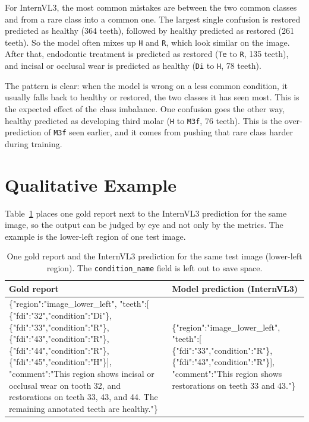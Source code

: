 \documentclass[a4paper,12pt]{report}
\begin{document}
For InternVL3, the most common mistakes are between the two common classes and from a rare class into a common one. The largest single confusion is restored predicted as healthy (364 teeth), followed by healthy predicted as restored (261 teeth). So the model often mixes up \texttt{H} and \texttt{R}, which look similar on the image. After that, endodontic treatment is predicted as restored (\texttt{Te} to \texttt{R}, 135 teeth), and incisal or occlusal wear is predicted as healthy (\texttt{Di} to \texttt{H}, 78 teeth).

The pattern is clear: when the model is wrong on a less common condition, it usually falls back to healthy or restored, the two classes it has seen most. This is the expected effect of the class imbalance. One confusion goes the other way, healthy predicted as developing third molar (\texttt{H} to \texttt{M3f}, 76 teeth). This is the over-prediction of \texttt{M3f} seen earlier, and it comes from pushing that rare class harder during training.

\section{Qualitative Example}

Table~\ref{tab:qualitative} places one gold report next to the InternVL3 prediction for the same image, so the output can be judged by eye and not only by the metrics. The example is the lower-left region of one test image.

\begin{table}[H]
\centering
\caption{One gold report and the InternVL3 prediction for the same test image (lower-left region). The \texttt{condition\_name} field is left out to save space.}
\label{tab:qualitative}
\begin{tabular}{p{6cm}p{6cm}}
\toprule
Gold report & Model prediction (InternVL3) \\
\midrule
{\ttfamily\footnotesize
\{"region":"image\_lower\_left",\newline
"teeth":[\newline
\{"fdi":"32","condition":"Di"\},\newline
\{"fdi":"33","condition":"R"\},\newline
\{"fdi":"43","condition":"R"\},\newline
\{"fdi":"44","condition":"R"\},\newline
\{"fdi":"45","condition":"H"\}],\newline
"comment":"This region shows incisal or occlusal wear on tooth 32, and restorations on teeth 33, 43, and 44. The remaining annotated teeth are healthy."\}
}
&
{\ttfamily\footnotesize
\{"region":"image\_lower\_left",\newline
"teeth":[\newline
\{"fdi":"33","condition":"R"\},\newline
\{"fdi":"43","condition":"R"\}],\newline
"comment":"This region shows restorations on teeth 33 and 43."\}
}
\\
\bottomrule
\end{tabular}
\end{table}
\end{document}

